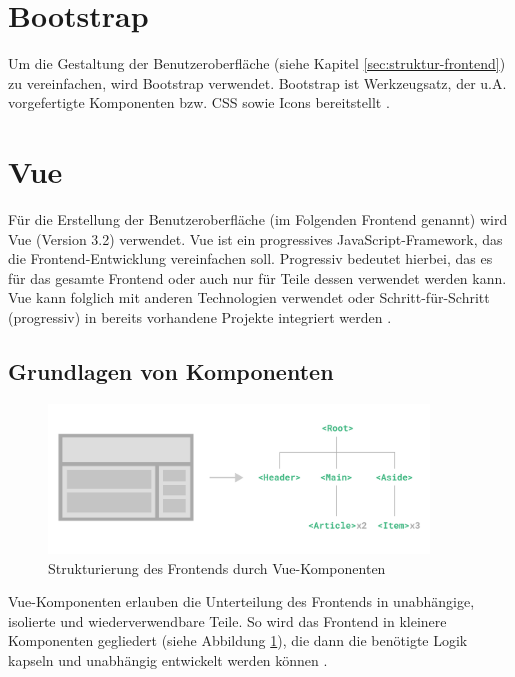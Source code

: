 %
%
\section{Bootstrap}
Um die Gestaltung der Benutzeroberfläche (siehe Kapitel \ref{sec:struktur-frontend}) zu vereinfachen, wird Bootstrap verwendet. Bootstrap ist Werkzeugsatz, der u.A. vorgefertigte Komponenten bzw. CSS sowie Icons bereitstellt \cite[vgl.][]{Bootstrap}.

%
%
\section{Vue}

Für die Erstellung der Benutzeroberfläche (im Folgenden \glqq Frontend\grqq{} genannt) wird Vue (Version 3.2) verwendet. Vue ist ein progressives JavaScript-Framework, das die Frontend-Entwicklung vereinfachen soll. Progressiv bedeutet hierbei, das es für das gesamte Frontend oder auch nur für Teile dessen verwendet werden kann. Vue kann folglich mit anderen Technologien verwendet oder Schritt-für-Schritt (progressiv) in bereits vorhandene Projekte integriert werden \cite[vgl.][]{VueIntroduction}.

%
%
\subsection{Grundlagen von Komponenten}
\begin{figure}[H]
  \includegraphics[width=0.9\textwidth]{images/vue-components.png}
  \centering
  \caption[Vue-Komponenten]{Strukturierung des Frontends durch Vue-Komponenten \cite{VueComponentBasics}}
  \label{fig:vue-components}
\end{figure}

Vue-Komponenten erlauben die Unterteilung des Frontends in unabhängige, isolierte und wiederverwendbare Teile. So wird das Frontend in kleinere Komponenten gegliedert (siehe Abbildung \ref{fig:vue-components}), die dann die benötigte Logik kapseln und unabhängig entwickelt werden können \cite[vgl.][]{VueComponentBasics}.

